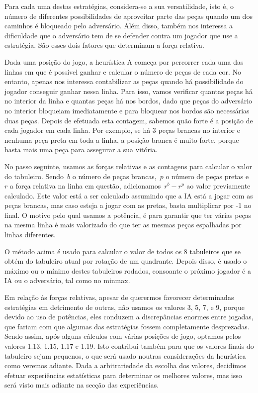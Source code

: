 Para cada uma destas estratégias, considera-se a sua versatilidade, isto é, o número de diferentes possibilidades de aproveitar parte das peças quando um dos caminhos é bloqueado pelo adversário. Além disso, também nos interessa a dificuldade que o adversário tem de se defender contra um jogador que use a estratégia. São esses dois fatores que determinam a força relativa.

Dada uma posição do jogo, a heurística A começa por percorrer cada uma das linhas em que é possível ganhar e calcular o número de peças de cada cor. No entanto, apenas nos interessa contabilizar as peças quando há possibilidade do jogador conseguir ganhar nessa linha. Para isso, vamos verificar quantas peças há no interior da linha e quantas peças há nos bordos, dado que peças do adversário no interior bloqueiam imediatamente e para bloquear nos bordos são necessárias duas peças. Depois de efetuada esta contagem, sabemos quão forte é a posição de cada jogador em cada linha. Por exemplo, se há 3 peças brancas no interior e nenhuma peça preta em toda a linha, a posição branca é muito forte, porque basta mais uma peça para assegurar a sua vitória. 

No passo seguinte, usamos as forças relativas e as contagens para calcular o valor do tabuleiro. Sendo~$b$ o número de peças brancas,~$p$ o número de peças pretas e~$r$ a força relativa na linha em questão, adicionamos~$r^b - r^p$ ao valor previamente calculado. Este valor está a ser calculado assumindo que a IA está a jogar com as peças brancas, mas caso esteja a jogar com as pretas, basta multiplicar por -1 no final. O motivo pelo qual usamos a potência, é para garantir que ter várias peças na mesma linha é mais valorizado do que ter as mesmas peças espalhadas por linhas diferentes.

O método acima é usado para calcular o valor de todos os 8 tabuleiros que se obtém do tabuleiro atual por rotação de um quadrante. Depois disso, é usado o máximo ou o mínimo destes tabuleiros rodados, consoante o próximo jogador é a IA ou o adversário, tal como no minmax.

Em relação às forças relativas, apesar de querermos favorecer determinadas estratégias em detrimento de outras, não usamos os valores 3, 5, 7, e 9, porque devido ao uso de potências, eles conduzem a discrepâncias enormes entre jogadas, que fariam com que algumas das estratégias fossem completamente desprezadas. Sendo assim, após alguns cálculos com várias posições de jogo, optamos pelos valores 1.13, 1.15, 1.17 e 1.19. Isto contribui também para que os valores finais do tabuleiro sejam pequenos, o que será usado noutras considerações da heurística como veremos adiante. Dada a arbitrariedade da escolha dos valores, decidimos efetuar experiências estatísticas para determinar os melhores valores, mas isso será visto mais adiante na secção das experiências.

